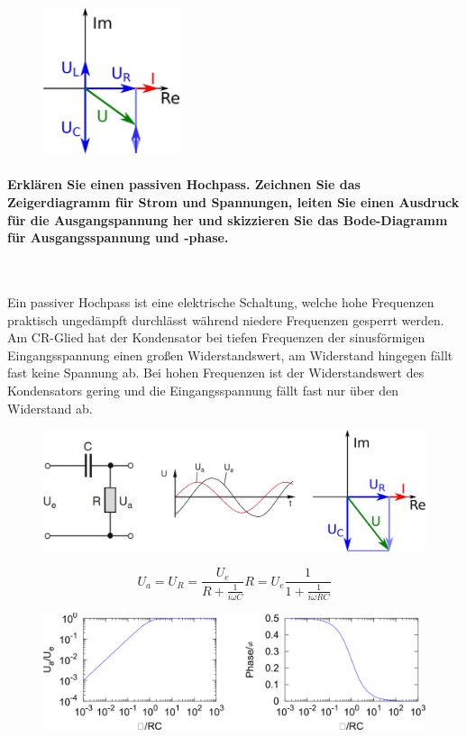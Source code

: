 \documentclass[a4paper, 11pt, ngerman, parskip=half-]{scrartcl}
\begin{document}
\begin{figure}[H]
    \centering
    \includegraphics[width=4cm]{image/10/2}
\end{figure}

\paragraph{Erklären Sie einen passiven Hochpass. Zeichnen Sie das Zeigerdiagramm für Strom und
    Spannungen, leiten Sie einen Ausdruck für die Ausgangspannung her und skizzieren Sie das
    Bode-Diagramm für Ausgangsspannung und -phase.} ~

Ein passiver Hochpass ist eine elektrische Schaltung, welche hohe Frequenzen praktisch ungedämpft
durchlässt während niedere Frequenzen gesperrt werden. Am CR-Glied hat der Kondensator bei tiefen
Frequenzen der sinusförmigen Eingangsspannung einen großen Widerstandswert, am Widerstand hingegen
fällt fast keine Spannung ab. Bei hohen Frequenzen ist der Widerstandswert des Kondensators gering
und die Eingangsspannung fällt fast nur über den Widerstand ab.

\begin{figure}[H]
    \centering
    \includegraphics[width=12cm]{image/10/3.1}
\end{figure}
\begin{equation}
    U_a
    = U_R
    = \frac{U_e}{R + \frac{1}{i \omega C}} R
    = U_e \frac{1}{1 + \frac{1}{i \omega R C}}
\end{equation}
\begin{figure}[H]
    \centering
    \includegraphics[width=12cm]{image/10/3.2}
\end{figure}
\end{document}

